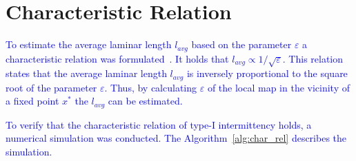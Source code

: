 \section{Characteristic Relation}


\textcolor{blue}{
To estimate the average laminar length $l_{avg}$ based on the parameter $\varepsilon$ a characteristic relation was formulated~\cite{Elaskar2017}.
It holds that $l_{avg} \propto 1/\sqrt{\varepsilon}$.
This relation states that the average laminar length $l_{avg}$ is inversely proportional to the square root of the parameter $\varepsilon$.
Thus, by calculating $\varepsilon$ of the local map in the vicinity of a fixed point $x^{*}$ the $l_{avg}$ can be estimated.
}
\par
\textcolor{blue}{
To verify that the characteristic relation of type-I intermittency holds, a numerical simulation was conducted.
The Algorithm~\ref{alg:char_rel} describes the simulation.
}

